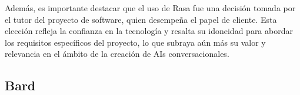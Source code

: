 Además, es importante destacar que el uso de Rasa fue una decisión tomada por el tutor del proyecto de software, quien desempeña el papel de cliente. Esta elección refleja la confianza en la tecnología y resalta su idoneidad para abordar los requisitos específicos del proyecto, lo que subraya aún más su valor y relevancia en el ámbito de la creación de AIs conversacionales.
\subsection{Bard}


